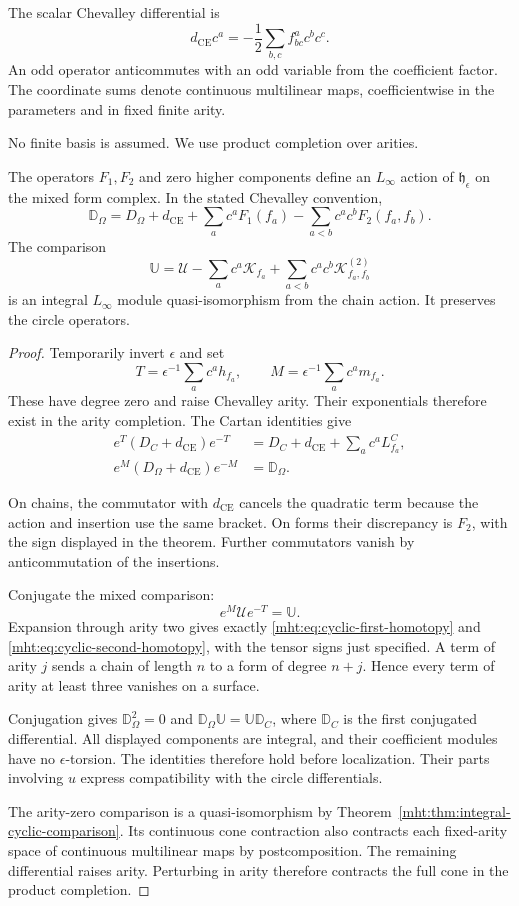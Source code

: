 The scalar Chevalley differential is
\[
 d_{\mathrm{CE}}c^a=-\frac12\sum_{b,c}f^a_{bc}c^bc^c.
\]
An odd operator anticommutes with an odd variable from the
coefficient factor. The coordinate sums denote continuous
multilinear maps, coefficientwise in the parameters and in
fixed finite arity.

No finite basis is assumed. We use
product completion over arities.

\begin{theorem}\label{mht:thm:cyclic-hamiltonian-comparison}
The operators $F_1,F_2$ and zero higher components define an
$L_\infty$ action of $\mathfrak h_\epsilon$ on the mixed
form complex. In the stated Chevalley convention,
\[
 \mathbb D_\Omega
   =D_\Omega+d_{\mathrm{CE}}
       +\sum_a c^a F_1(f_a)
       -\sum_{a<b}c^ac^bF_2(f_a,f_b).
\]
The comparison
\[
 \mathbb U=\mathcal U-\sum_a c^a\mathcal K_{f_a}
                    +\sum_{a<b}c^ac^b
                              \mathcal K^{(2)}_{f_a,f_b}
\]
is an integral $L_\infty$ module quasi-isomorphism from the
chain action. It preserves the circle operators.
\end{theorem}
\begin{proof}
Temporarily invert $\epsilon$ and set
\[
 T=\epsilon^{-1}\sum_a c^a h_{f_a},\qquad
 M=\epsilon^{-1}\sum_a c^a m_{f_a}.
\]
These have degree zero and raise Chevalley arity.
Their exponentials therefore exist in the arity completion.
The Cartan identities give
\begin{align*}
 e^T(D_C+d_{\mathrm{CE}})e^{-T}
   &=D_C+d_{\mathrm{CE}}+\sum_a c^aL_{f_a}^C,\\
 e^M(D_\Omega+d_{\mathrm{CE}})e^{-M}
   &=\mathbb D_\Omega.
\end{align*}

On chains, the commutator with $d_{\mathrm{CE}}$ cancels
the quadratic term because the action and insertion use
the same bracket. On forms their discrepancy is $F_2$,
with the sign displayed in the theorem.
Further commutators vanish by anticommutation of the insertions.

Conjugate the mixed comparison:
\[
 e^M\mathcal Ue^{-T}=\mathbb U.
\]
Expansion through arity two gives exactly
\eqref{mht:eq:cyclic-first-homotopy} and
\eqref{mht:eq:cyclic-second-homotopy}, with the tensor signs
just specified. A term of arity $j$ sends a chain of length
$n$ to a form of degree $n+j$. Hence every term of arity
at least three vanishes on a surface.

Conjugation gives $\mathbb D_\Omega^2=0$ and
$\mathbb D_\Omega\mathbb U=\mathbb U\mathbb D_C$,
where $\mathbb D_C$ is the first conjugated differential.
All displayed components are integral, and their coefficient
modules have no $\epsilon$-torsion. The identities therefore
hold before localization. Their parts involving $u$ express
compatibility with the circle differentials.

The arity-zero comparison is a quasi-isomorphism by
Theorem~\ref{mht:thm:integral-cyclic-comparison}.
Its continuous cone contraction also contracts each fixed-arity
space of continuous multilinear maps by postcomposition.
The remaining differential raises arity. Perturbing in arity
therefore contracts the full cone in the product completion.
\end{proof}

